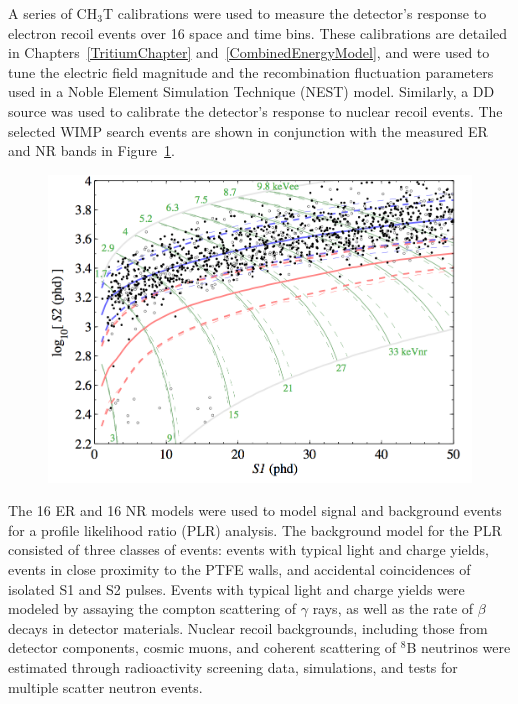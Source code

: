 A series of CH$_3$T calibrations were used to measure the detector's response to electron recoil events over 16 space and time bins.  These calibrations are detailed in Chapters~\ref{TritiumChapter} and~\ref{CombinedEnergyModel}, and were used to tune the electric field magnitude and the recombination fluctuation parameters used in a Noble Element Simulation Technique (NEST) model.  Similarly, a DD source was used to calibrate the detector's response to nuclear recoil events.  The selected WIMP search events are shown in conjunction with the measured ER and NR bands in Figure~\ref{Run4Events}.  

 \begin{figure} 
\includegraphics[scale=.4]{Run4events.png} 
\label{Run4Events}
\end{figure}

The 16 ER and 16 NR models were used to model signal and background events for a profile likelihood ratio (PLR) analysis. The background model for the PLR consisted of three classes of events:  events with typical light and charge yields, events in close proximity to the PTFE walls, and accidental coincidences of isolated S1 and S2 pulses.  Events with typical light and charge yields were modeled by assaying the compton scattering of $\gamma$ rays, as well as the rate of $\beta$ decays in detector materials.  Nuclear recoil backgrounds, including those from detector components, cosmic muons, and coherent scattering of $^8$B neutrinos were estimated through radioactivity screening data, simulations, and tests for multiple scatter neutron events. 

